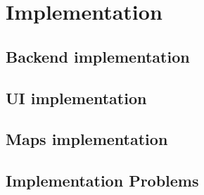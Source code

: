 \section{Implementation}

\subsection{Backend implementation}
\subsection{UI implementation}
\subsection{Maps implementation}

\subsection{Implementation Problems}


